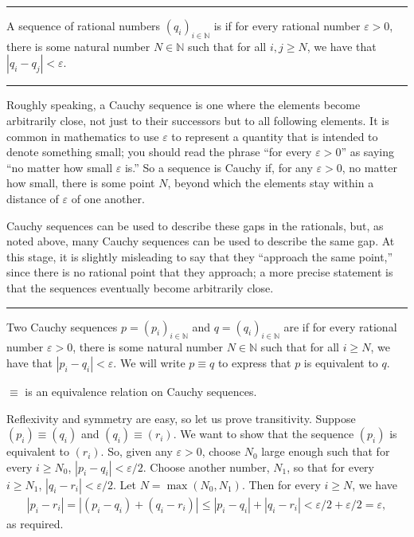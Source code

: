 \documentclass[letterpaper,10pt,english]{sphinxmanual}
\begin{document}
\bigskip\hrule\bigskip


\sphinxAtStartPar
{} A sequence of rational numbers \((q_i)_{i \in \mathbb{N}}\) is  if for every rational number \(\varepsilon > 0\), there is some natural number \(N \in \mathbb{N}\) such that for all \(i, j \geq N\), we have that \(|q_i - q_j| < \varepsilon\).


\bigskip\hrule\bigskip


\sphinxAtStartPar
Roughly speaking, a Cauchy sequence is one where the elements become arbitrarily close, not just to their successors but to all following elements. It is common in mathematics to use \(\varepsilon\) to represent a quantity that is intended to denote something small; you should read the phrase “for every \(\varepsilon > 0\)” as saying “no matter how small \(\varepsilon\) is.” So a sequence is Cauchy if, for any \(\varepsilon > 0\), no matter how small, there is some point \(N\), beyond which the elements stay within a distance of \(\varepsilon\) of one another.

\sphinxAtStartPar
Cauchy sequences can be used to describe these gaps in the rationals, but, as noted above, many Cauchy sequences can be used to describe the same gap. At this stage, it is slightly misleading to say that they “approach the same point,” since there is no rational point that they approach; a more precise statement is that the sequences eventually become arbitrarily close.


\bigskip\hrule\bigskip


\sphinxAtStartPar
{} Two Cauchy sequences \(p = (p_i)_{i \in \mathbb{N}}\) and \(q = (q_i)_{i \in \mathbb{N}}\) are  if for every rational number \(\varepsilon > 0\), there is some natural number \(N \in \mathbb{N}\) such that for all \(i \geq N\), we have that \(|p_i - q_i| < \varepsilon\). We will write \(p \equiv q\) to express that \(p\) is equivalent to \(q\).

\sphinxAtStartPar
{} \(\equiv\) is an equivalence relation on Cauchy sequences.

\sphinxAtStartPar
{} Reflexivity and symmetry are easy, so let us prove transitivity. Suppose \((p_i) \equiv (q_i)\) and \((q_i) \equiv (r_i)\). We want to show that the sequence \((p_i)\) is equivalent to \((r_i)\). So, given any \(\varepsilon > 0\), choose \(N_0\) large enough such that for every \(i \ge N_0\), \(|p_i - q_i| < \varepsilon / 2\). Choose another number, \(N_1\), so that for every \(i \geq N_1\), \(|q_i - r_i| < \varepsilon / 2\). Let \(N = \max(N_0, N_1)\). Then for every \(i \geq N\), we have
\begin{equation*}
\begin{split}|p_i - r_i | = |(p_i - q_i) + (q_i - r_i)| \leq |p_i - q_i| + |q_i - r_i| < \varepsilon / 2 + \varepsilon / 2 = \varepsilon,\end{split}
\end{equation*}
\sphinxAtStartPar
as required.
\end{document}
